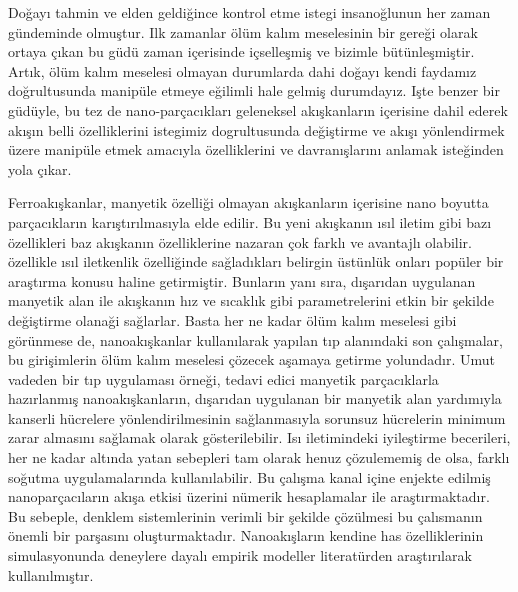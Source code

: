 Do\u{g}ay{\i} tahmin ve elden geldi\u{g}ince kontrol etme istegi insano\u{g}lunun her zaman g\"{u}ndeminde olmu\c{s}tur. Ilk zamanlar \"{o}l\"{u}m kal{\i}m meselesinin bir gere\u{g}i olarak ortaya \c{c}{\i}kan bu g\"{u}d\"{u} zaman i\c{c}erisinde i\c{c}selle\c{s}mi\c{s} ve bizimle b\"{u}t\"{u}nle\c{s}mi\c{s}tir. Art{\i}k, \"{o}l\"{u}m kal{\i}m meselesi olmayan durumlarda dahi do\u{g}ay{\i} kendi faydam{\i}z do\u{g}rultusunda manip\"{u}le etmeye e\u{g}ilimli hale gelmi\c{s} durumday{\i}z. I\c{s}te benzer bir g\"{u}d\"{u}yle, bu tez de nano-par\c{c}ac{\i}klar{\i} geleneksel ak{\i}\c{s}kanlar{\i}n i\c{c}erisine dahil ederek ak{\i}\c{s}{\i}n belli \"{o}zelliklerini istegimiz dogrultusunda de\u{g}i\c{s}tirme ve ak{\i}\c{s}{\i} y\"{o}nlendirmek \"{u}zere manip\"{u}le etmek amac{\i}yla \"{o}zelliklerini ve davran{\i}\c{s}lar{\i}n{\i} anlamak iste\u{g}inden yola \c{c}{\i}kar.

Ferroak{\i}\c{s}kanlar, manyetik \"{o}zelli\u{g}i olmayan ak{\i}\c{s}kanlar{\i}n i\c{c}erisine nano boyutta par\c{c}ac{\i}klar{\i}n kar{\i}\c{s}t{\i}r{\i}lmas{\i}yla elde edilir. Bu yeni ak{\i}\c{s}kan{\i}n {\i}s{\i}l iletim gibi baz{\i} \"{o}zellikleri baz ak{\i}\c{s}kan{\i}n \"{o}zelliklerine nazaran \c{c}ok farkl{\i} ve avantajl{\i} olabilir.  \"{o}zellikle {\i}s{\i}l iletkenlik \"{o}zelli\u{g}inde sa\u{g}lad{\i}klar{\i} belirgin \"{u}st\"{u}nl\"{u}k onlar{\i} pop\"{u}ler bir ara\c{s}t{\i}rma konusu haline getirmi\c{s}tir. Bunlar{\i}n yan{\i} s{\i}ra, d{\i}\c{s}ar{\i}dan uygulanan manyetik alan ile ak{\i}\c{s}kan{\i}n h{\i}z ve s{\i}cakl{\i}k gibi parametrelerini etkin bir \c{s}ekilde de\u{g}i\c{s}tirme olana\u{g}i sa\u{g}larlar. Basta her ne kadar \"{o}l\"{u}m kal{\i}m meselesi gibi g\"{o}r\"{u}nmese de, nanoak{\i}\c{s}kanlar kullan{\i}larak yap{\i}lan t{\i}p alan{\i}ndaki son \c{c}al{\i}\c{s}malar, bu giri\c{s}imlerin \"{o}l\"{u}m kal{\i}m meselesi \c{c}\"{o}zecek a\c{s}amaya getirme yolundad{\i}r. Umut vadeden bir t{\i}p uygulamas{\i} \"{o}rne\u{g}i, tedavi edici manyetik par\c{c}ac{\i}klarla haz{\i}rlanm{\i}\c{s} nanoak{\i}\c{s}kanlar{\i}n, d{\i}\c{s}ar{\i}dan uygulanan bir manyetik alan yard{\i}m{\i}yla kanserli h\"{u}crelere y\"{o}nlendirilmesinin sa\u{g}lanmas{\i}yla sorunsuz h\"{u}crelerin minimum zarar almas{\i}n{\i} sa\u{g}lamak olarak g\"{o}sterilebilir. Is{\i} iletimindeki iyile\c{s}tirme becerileri, her ne kadar alt{\i}nda yatan sebepleri tam olarak henuz \c{c}\"{o}zulememi\c{s} de olsa, farkl{\i} so\u{g}utma uygulamalar{\i}nda kullan{\i}labilir. Bu \c{c}al{\i}\c{s}ma kanal i\c{c}ine enjekte edilmi\c{s} nanopar\c{c}ac{\i}lar{\i}n ak{\i}\c{s}a etkisi \"{u}zerini n\"{u}merik hesaplamalar ile ara\c{s}t{\i}rmaktad{\i}r. Bu sebeple, denklem sistemlerinin verimli bir \c{s}ekilde \c{c}\"{o}z\"{u}lmesi bu \c{c}al{\i}sman{\i}n \"{o}nemli bir par\c{s}as{\i}n{\i} olu\c{s}turmaktad{\i}r. Nanoak{\i}\c{s}lar{\i}n kendine has \"{o}zelliklerinin simulasyonunda deneylere dayal{\i} empirik modeller literat\"{u}rden ara\c{s}t{\i}r{\i}larak kullan{\i}lm{\i}\c{s}t{\i}r.

